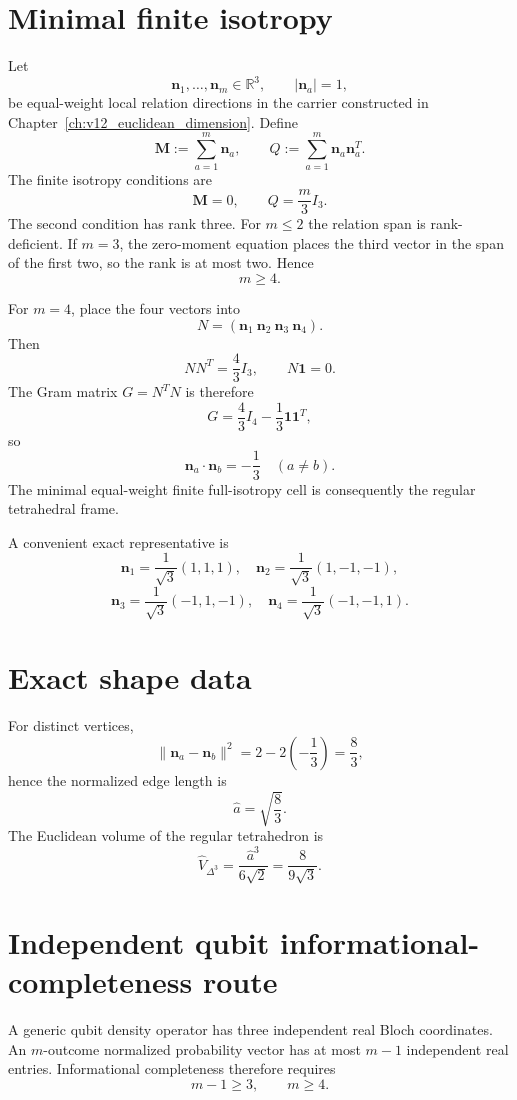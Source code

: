\section{Minimal finite isotropy}

Let
\[
\mathbf n_1,\ldots,\mathbf n_m\in\mathbb R^3,
\qquad
|\mathbf n_a|=1,
\]
be equal-weight local relation directions in the carrier constructed in
Chapter~\ref{ch:v12_euclidean_dimension}.  Define
\[
\mathbf M:=\sum_{a=1}^{m}\mathbf n_a,
\qquad
Q:=\sum_{a=1}^{m}\mathbf n_a\mathbf n_a^T.
\]
The finite isotropy conditions are
\[
\boxed{\mathbf M=0},
\qquad
\boxed{Q=\frac m3 I_3}.
\]
The second condition has rank three.  For \(m\le2\) the relation span is
rank-deficient.  If \(m=3\), the zero-moment equation places the third vector in
the span of the first two, so the rank is at most two.  Hence
\[
\boxed{m\ge4.}
\]

For \(m=4\), place the four vectors into
\[
N=(\mathbf n_1\ \mathbf n_2\ \mathbf n_3\ \mathbf n_4).
\]
Then
\[
NN^T=\frac43I_3,
\qquad
N\mathbf1=0.
\]
The Gram matrix \(G=N^TN\) is therefore
\[
\boxed{
G
=
\frac43I_4-\frac13\mathbf1\mathbf1^T,
}
\]
so
\[
\boxed{
\mathbf n_a\cdot\mathbf n_b
=
-\frac13
\quad(a\neq b).
}
\]
The minimal equal-weight finite full-isotropy cell is consequently the regular
tetrahedral frame.

A convenient exact representative is
\[
\mathbf n_1=\frac1{\sqrt3}(1,1,1),\quad
\mathbf n_2=\frac1{\sqrt3}(1,-1,-1),
\]
\[
\mathbf n_3=\frac1{\sqrt3}(-1,1,-1),\quad
\mathbf n_4=\frac1{\sqrt3}(-1,-1,1).
\]

\section{Exact shape data}

For distinct vertices,
\[
\|\mathbf n_a-\mathbf n_b\|^2
=
2-2\left(-\frac13\right)
=
\frac83,
\]
hence the normalized edge length is
\[
\boxed{\hat a=\sqrt{\frac83}}.
\]
The Euclidean volume of the regular tetrahedron is
\[
\boxed{
\hat V_{\Delta^3}
=
\frac{\hat a^3}{6\sqrt2}
=
\frac{8}{9\sqrt3}.
}
\]

\section{Independent qubit informational-completeness route}

A generic qubit density operator has three independent real Bloch coordinates.
An \(m\)-outcome normalized probability vector has at most \(m-1\) independent
real entries.  Informational completeness therefore requires
\[
m-1\ge3,
\qquad
\boxed{m\ge4}.
\]

